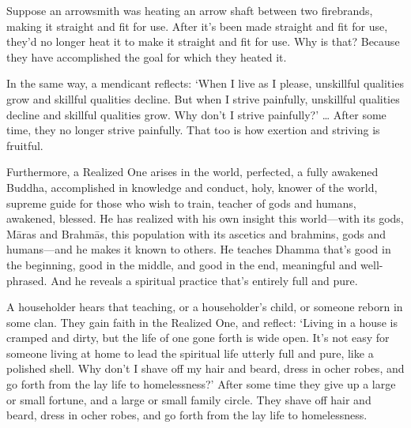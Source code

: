 \documentclass[12pt,openany]{book}%
\begin{document}
Suppose an arrowsmith was heating an arrow shaft between two firebrands, making it straight and fit for use. After it’s been made straight and fit for use, they’d no longer heat it to make it straight and fit for use. Why is that? Because they have accomplished the goal for which they heated it. 

In the same way, a mendicant reflects: ‘When I live as I please, unskillful qualities grow and skillful qualities decline. But when I strive painfully, unskillful qualities decline and skillful qualities grow. Why don’t I strive painfully?’ … After some time, they no longer strive painfully. That too is how exertion and striving is fruitful. 

Furthermore, a Realized One arises in the world, perfected, a fully awakened Buddha, accomplished in knowledge and conduct, holy, knower of the world, supreme guide for those who wish to train, teacher of gods and humans, awakened, blessed. He has realized with his own insight this world—with its gods, \textsanskrit{Māras} and \textsanskrit{Brahmās}, this population with its ascetics and brahmins, gods and humans—and he makes it known to others. He teaches Dhamma that’s good in the beginning, good in the middle, and good in the end, meaningful and well-phrased. And he reveals a spiritual practice that’s entirely full and pure. 

A householder hears that teaching, or a householder’s child, or someone reborn in some clan. They gain faith in the Realized One, and reflect: ‘Living in a house is cramped and dirty, but the life of one gone forth is wide open. It’s not easy for someone living at home to lead the spiritual life utterly full and pure, like a polished shell. Why don’t I shave off my hair and beard, dress in ocher robes, and go forth from the lay life to homelessness?’ After some time they give up a large or small fortune, and a large or small family circle. They shave off hair and beard, dress in ocher robes, and go forth from the lay life to homelessness. 
\end{document}
